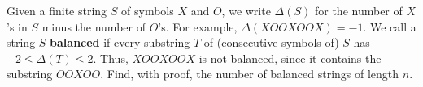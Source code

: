 Given a finite string $S$ of symbols $X$ and $O$, we write $\Delta(S)$
for the number of $X$'s in $S$ minus the number of $O$'s. For example,
$\Delta(XOOXOOX) = -1$. We call a string $S$ \textbf{balanced} if every
substring $T$ of (consecutive symbols of) $S$ has $-2 \leq \Delta(T)
\leq 2$. Thus, $XOOXOOX$ is not balanced, since it contains the
substring $OOXOO$. Find, with proof, the number of balanced strings of
length $n$.
